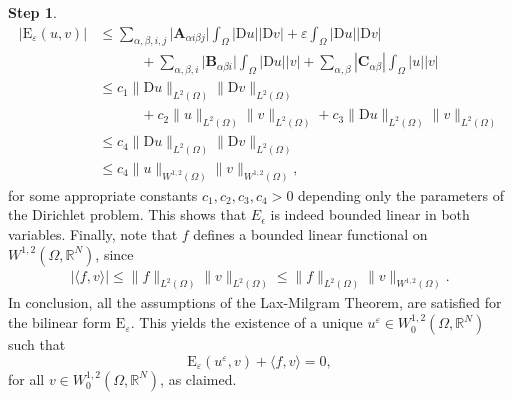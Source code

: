 \documentclass{amsart}
\numberwithin{equation}{section}
\numberwithin{thm}{section}
\theoremstyle{definition}
\newtheorem{proofpart}{Step}
\def\R{\mathbb{R}}
\renewcommand{\:}{\!:\!} %
\newcommand{\e}{\varepsilon}
\renewcommand{\^}[1]{^{#1}_{\phantom{l}}}
\begin{document}
\begin{proofpart}
\begin{align}
\lvert \mathrm{E}_\e(u, v) \rvert &\leq \sum_{\alpha, \beta, i, j} \big| \mathbf{A}_{\alpha i \beta j} \big| \int_{\Omega} \lvert \mathrm{D}u \rvert \lvert \mathrm{D}v \rvert + \varepsilon  \int_{\Omega} \lvert \mathrm{D}u \rvert \lvert \mathrm{D}v \rvert 
\\ 
&\qquad\quad + \sum_{\alpha, \beta, i} \big| \mathbf{B}_{\alpha \beta i} \big| \int_{\Omega} \lvert \mathrm{D}u \rvert \lvert v \rvert + \sum_{\alpha, \beta} | \mathbf{C}_{\alpha \beta}| \int_{\Omega} \lvert u \rvert \lvert v \rvert \nonumber 
\\ 
&\leq c_{1} \| \mathrm{D}u \| _{L^2(\Omega)}\| \mathrm{D}v \| _{L^2(\Omega)} \nonumber 
\\ 
&\qquad\quad + c_{2} \| u \| _{L^2(\Omega)}\| v \| _{L^2(\Omega)} + c_{3} \| \mathrm{D}u \| _{L^2(\Omega)}\| v \| _{L^2(\Omega)} \nonumber 
\\ 
&\leq c_{4} \| \mathrm{D}u \| _{L^2(\Omega)}\| \mathrm{D}v \| _{L^2(\Omega)} \nonumber 
\\ 
&\leq  c_{4} \| u \| _{W^{1,2}(\Omega)}\| v \| _{W^{1,2}(\Omega)}, \nonumber
\end{align}
for some appropriate constants $c_1, c_2, c_3,c_4>0$ depending only the parameters of the Dirichlet problem. This shows that $E_{\epsilon}$ is indeed bounded linear in both variables. Finally, note that $f$ defines a bounded linear functional on $W^{1,2}(\Omega,\R^N)$, since
\begin{align}
\big|  \langle f,v \rangle \big| \leq \| f \| _{L^2(\Omega)}\| v \| _{L^2(\Omega)} \leq \| f \| _{L^2(\Omega)}\| v \| _{W^{1,2}(\Omega)}. \nonumber
\end{align}
In conclusion, all the assumptions of the Lax-Milgram Theorem, are satisfied for the bilinear form $\mathrm{E}_\e$. This yields the existence of a unique $u^\varepsilon \in W^{1,2}_{0}(\Omega, \mathbb{R}^N)$ such that
\[
\mathrm{E}_\e(u^{\varepsilon}, v) + \langle f,v \rangle = 0,
\]
for all $v \in W^{1,2}_0(\Omega,\R^N)$, as claimed. 
\end{proofpart}





\end{document}
